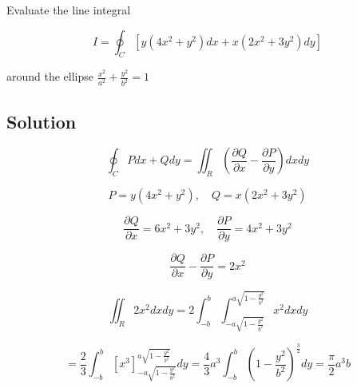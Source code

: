 \documentclass[12pt]{article}
\begin{document}
Evaluate the line integral

\[
    I=\oint_C\left[y\left(4 x^2+y^2\right) d x+x\left(2 x^2+3 y^2\right) d y\right]
\]

around the ellipse \(\frac{x^2}{a^2}+\frac{y^2}{b^2}=1\)

\subsection{Solution}

\[
    \oint_C P d x+Q d y=\iint_R\left(\frac{\partial Q}{\partial x}-\frac{\partial P}{\partial y}\right) d x d y
\]

\[
    P = y\left(4 x^2+y^2\right), \quad Q = x\left(2 x^2+3 y^2\right)
\]

\[
    \frac{\partial Q}{\partial x} = 6x^2 + 3 y^2, \quad \frac{\partial P}{\partial y} = 4 x^2 + 3 y^2
\]

\[
    \frac{\partial Q}{\partial x} - \frac{\partial P}{\partial y} = 2 x^2
\]

\[
    \iint_R 2 x^2 d x d y
    = 2 \int_{-b}^{b} \int_{-a \sqrt{1 - \frac{y^2}{b^2}}}^{a \sqrt{1 - \frac{y^2}{b^2}}} x^2 d x d y
\]

\[
    = \frac{2}{3} \int_{-b}^{b} {\left[ x^3 \right]}_{-a \sqrt{1 - \frac{y^2}{b^2}}}^{a \sqrt{1 - \frac{y^2}{b^2}}} d y
    = \frac{4}{3} a^3 \int_{-b}^{b} {\left(1 - \frac{y^2}{b^2}\right) }^\frac{3}{2} d y
    = \frac{\pi}{2} a^3 b
\]

\newpage


\nocite{El-Deeb_PEU-218_Assignments}
\end{document}

